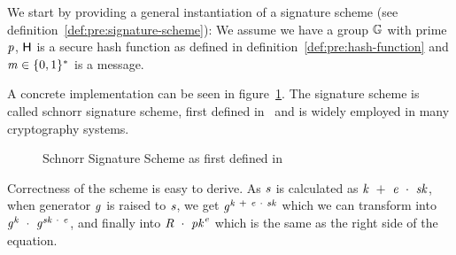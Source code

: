 We start by providing a general instantiation of a signature scheme (see definition~\ref{def:pre:signature-scheme}):
We assume we have a group $\mathbb{G}$ with prime $\mathit{p}$, $\mathsf{H}$ is a secure hash function as defined in definition~\ref{def:pre:hash-function} and $\mathit{m} \in \{0,1\}^{*}$ is a message.


A concrete implementation can be seen in figure~\ref{fig:schnorr}. The signature scheme is called schnorr signature scheme, first defined in~\cite{schnorr1989efficient} and is widely employed in many cryptography systems.
\begin{figure}
    \begin{center}
        \fbox{
        \begin{varwidth}{\textwidth}
            \procedure[linenumbering]{$\procSetup{\varSecParam}$} {
            \varKey \sample \cnstIntegersPrimeWithoutZero{\varPrime} \\
            \pcreturn (\varSecKey \opAssign \varKey \opSeperate \varPubKey \opAssign \funGen{\varKey})
            }
            \procedure[linenumbering]{$\procSign{\varMsg}{\varSecKey}$}{
            \varNonce \sample \cnstIntegersPrimeWithoutZero{\varPrime} \\
            \varRand \opAssign \funGen{\varNonce} \\
            \varSchnorrChallenge \opAssign \funHash{\varMsg \opConc \varRand \opConc \varPubKey} \\
            \varS \opAssign \varNonce \opAddScalar \varSchnorrChallenge \opTimesScalar \varSecKey \\
            \pcreturn \varSignature \opAssign (\varS, \varRand)
            }
            \procedure[linenumbering]{$\procVerf{\varMsg}{\varSignature}{\varPubKey}$} {
            (\varS \opSeperate \varRand) \opFunResult \varSignature \\
            \varSchnorrChallenge \opAssign \funHash{\varMsg \opConc \varRand \opConc \varPubKey} \\
            \pcreturn \funGen{\varS} \opEq \varRand \opAddPoint \opPointScalar{\varPubKey}{\varSchnorrChallenge}
            }
        \end{varwidth}
        }
    \end{center}
    \caption{Schnorr Signature Scheme as first defined in~\cite{schnorr1989efficient}}
    \label{fig:schnorr}
\end{figure}
Correctness of the scheme is easy to derive. As $\mathit{s}$ is calculated as $\mathit{k} ~+~ \mathit{e} ~\cdot~ \mathit{sk}$, when generator $\mathit{g}$ is raised to $\mathit{s}$, we get
$\mathit{g}^{\mathit{k} ~+~ \mathit{e} ~\cdot~ \mathit{sk}}$ which we can transform into $\mathit{g}^{\mathit{k}} ~\cdot~ \mathit{g}^{\mathit{sk} ~\cdot~ \mathit{e}}$, and finally
into $\mathit{R} ~\cdot~ \mathit{pk}^{\mathit{e}}$ which is the same as the right side of the equation.

